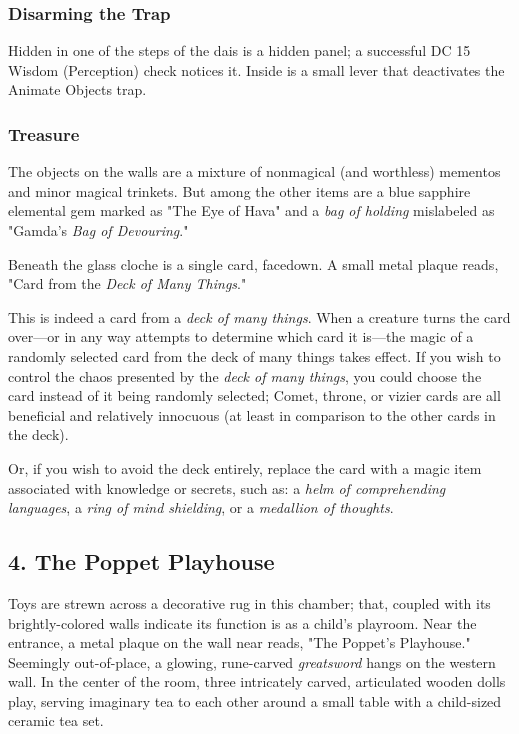 \documentclass[10pt,a4paper,twoside,bg=print,twocolumn,openany,nodeprecatedcode]{dndbook}
\begin{document}
\subsubsection{Disarming the Trap}
Hidden in one of the steps of the dais is a hidden panel; a successful DC 15 Wisdom (Perception) check notices it. Inside is a small lever that deactivates the Animate Objects trap.

\subsubsection{Treasure}
The objects on the walls are a mixture of nonmagical (and worthless) mementos and minor magical trinkets. But among the other items are a blue sapphire elemental gem marked as "The Eye of Hava" and a \textit{bag of holding} mislabeled as "Gamda's \textit{Bag of Devouring}."

Beneath the glass cloche is a single card, facedown. A small metal plaque reads, "Card from the \textit{Deck of Many Things}."

This is indeed a card from a \textit{deck of many things}. When a creature turns the card over—or in any way attempts to determine which card it is—the magic of a randomly selected card from the deck of many things takes effect. If you wish to control the chaos presented by the \textit{deck of many things}, you could choose the card instead of it being randomly selected; Comet, throne, or vizier cards are all beneficial and relatively innocuous (at least in comparison to the other cards in the deck).

Or, if you wish to avoid the deck entirely, replace the card with a magic item associated with knowledge or secrets, such as: a \textit{helm of comprehending languages}, a \textit{ring of mind shielding}, or a \textit{medallion of thoughts}.

\subsection{4. The Poppet Playhouse}
\begin{DndReadAloud}{}
Toys are strewn across a decorative rug in this chamber; that, coupled with its brightly-colored walls indicate its function is as a child's playroom. Near the entrance, a metal plaque on the wall near reads, "The Poppet's Playhouse." Seemingly out-of-place, a glowing, rune-carved \textit{greatsword} hangs on the western wall. In the center of the room, three intricately carved, articulated wooden dolls play, serving imaginary tea to each other around a small table with a child-sized ceramic tea set.

\end{DndReadAloud}
\end{document}
